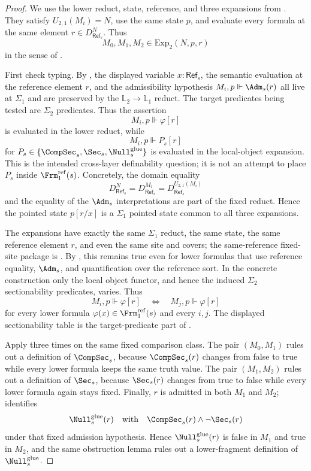\begin{proof}
We use the lower reduct, state, reference, and three expansions from . They satisfy $U_{2,1}(M_i)=N$, use the same state $p$, and evaluate every formula at the same element $r\in D_{\mathsf{Ref}_s}^N$. Thus
\[
M_0,M_1,M_2\in\mathrm{Exp}_2(N,p,r)
\]
in the sense of .

First check typing. By , the displayed variable $x:\mathsf{Ref}_s$, the semantic evaluation at the reference element $r$, and the admissibility hypothesis $M_i,p\Vdash\Adm_s(r)$ all live at $\Sigma_1$ and are preserved by the $\mathbb L_2\to\mathbb L_1$ reduct. The target predicates being tested are $\Sigma_2$ predicates. Thus the assertion
\[
M_i,p\Vdash\varphi[r]
\]
is evaluated in the lower reduct, while
\[
M_i,p\Vdash P_s[r]
\]
for $P_s\in\{\CompSec_s,\Sec_s,\Null_s^{\mathrm{glue}}\}$ is evaluated in the local-object expansion. This is the intended cross-layer definability question; it is not an attempt to place $P_s$ inside $\Frm_1^{\mathrm{ref}}(s)$.
Concretely, the domain equality
\[
D_{\mathsf{Ref}_s}^{N}
=D_{\mathsf{Ref}_s}^{M_i}
=D_{\mathsf{Ref}_s}^{U_{2,1}(M_i)}
\]
and the equality of the $\Adm_s$ interpretations are part of the fixed reduct. Hence the pointed state $p[r/x]$ is a $\Sigma_1$ pointed state common to all three expansions.

The expansions have exactly the same $\Sigma_1$ reduct, the same state, the same reference element $r$, and even the same site and covers; the same-reference fixed-site package is . By , this remains true even for lower formulas that use reference equality, $\Adm_s$, and quantification over the reference sort. In the concrete construction only the local object functor, and hence the induced $\Sigma_2$ sectionability predicates, varies. Thus
\[
M_i,p\Vdash\varphi[r]
\quad\Longleftrightarrow\quad
M_j,p\Vdash\varphi[r]
\]
for every lower formula $\varphi(x)\in\Frm_1^{\mathrm{ref}}(s)$ and every $i,j$. The displayed sectionability table is the target-predicate part of .

Apply  three times on the same fixed comparison class. The pair $(M_0,M_1)$ rules out a definition of $\CompSec_s$, because $\CompSec_s(r)$ changes from false to true while every lower formula keeps the same truth value. The pair $(M_1,M_2)$ rules out a definition of $\Sec_s$, because $\Sec_s(r)$ changes from true to false while every lower formula again stays fixed. Finally, $r$ is admitted in both $M_1$ and $M_2$;  identifies
\[
\Null^{\mathrm{glue}}_s(r)
\quad\text{with}\quad
\CompSec_s(r)\land \neg\Sec_s(r)
\]
under that fixed admission hypothesis. Hence $\Null^{\mathrm{glue}}_s(r)$ is false in $M_1$ and true in $M_2$, and the same obstruction lemma rules out a lower-fragment definition of $\Null^{\mathrm{glue}}_s$.


\end{proof}
